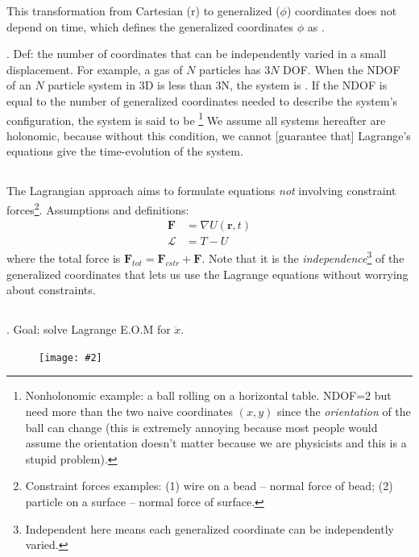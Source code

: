 \documentclass[10pt, twocolumn]{article}
\newcommand\myfig[2][0.3\textwidth]{\begin{figure}[h!]\centering\texttt{[image: \#2]}\end{figure}}
\newcommand{\myspace}{\vspace{3\bigskipamount}}
\newcommand\p{\Needspace{10\baselineskip} \noindent}
\newcommand\tlab[1]{\tag{#1}\label{#1}}
\begin{document}
This transformation from Cartesian (r) to generalized ($\phi$) coordinates does not depend on time, which defines the generalized coordinates $\phi$ as . 

\myspace
\p {}. Def: the number of coordinates that can be independently varied in a small displacement. For example, a gas of $N$ particles has $3N$ DOF. When the NDOF of an $N$ particle system in 3D is less than 3N, the system is . If the NDOF is equal to the number of generalized coordinates needed to describe the system's configuration, the system is said to be \footnote{Nonholonomic example: a ball rolling on a horizontal table. NDOF=2 but need more than the two naive coordinates $(x, y)$ since the \textit{orientation} of the ball can change (this is extremely annoying because most people would assume the orientation doesn't matter because we are physicists and this is a stupid problem).} We assume all systems hereafter are holonomic, because without this condition, we cannot [guarantee that] Lagrange's equations give the time-evolution of the system. 

\subsection{}

\p The Lagrangian approach aims to formulate equations \textit{not} involving constraint forces\footnote{Constraint forces examples: (1) wire on a bead -- normal force of bead; (2) particle on a surface -- normal force of surface.}. Assumptions and definitions:
\begin{align}
 \bm{F} &= \nabla U(\bm r, t) \tlab{7.41} \\
 \mathcal L &= T - U \tlab{7.42}
\end{align}
where the total force is $\bm F_{tot} = \bm F_{cstr} + \bm F$. Note that it is the \textit{independence}\footnote{Independent here means each generalized coordinate can be independently varied.} of the generalized coordinates that lets us use the Lagrange equations without worrying about constraints.

\myspace
{}
\subsection{}

\p {}. Goal: solve Lagrange E.O.M for $\ddot x$. 
\myfig[0.12\textwidth]{Atwood.PNG}
\end{document}
